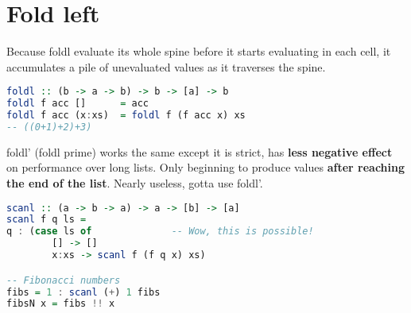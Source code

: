 \documentclass{article}
\begin{document}
\section{Fold left }
Because {\selectfont foldl} evaluate its whole spine before it starts evaluating in each cell, it accumulates
a pile of unevaluated values as it traverses the spine.
\begin{lstlisting}[language = Haskell]
foldl :: (b -> a -> b) -> b -> [a] -> b
foldl f acc []      = acc
foldl f acc (x:xs)  = foldl f (f acc x) xs  
-- ((0+1)+2)+3) \end{lstlisting}


{\selectfont foldl'} (foldl prime) works the same except it is strict, has \textbf{less negative effect} on performance
over long lists. Only beginning to produce values \textbf{after reaching the end of the list}.
Nearly useless, gotta use foldl'.
\begin{lstlisting}[language = Haskell]
scanl :: (a -> b -> a) -> a -> [b] -> [a]
scanl f q ls =
q : (case ls of              -- Wow, this is possible!
        [] -> []
        x:xs -> scanl f (f q x) xs)

-- Fibonacci numbers
fibs = 1 : scanl (+) 1 fibs
fibsN x = fibs !! x
\end{lstlisting}
\end{document}
